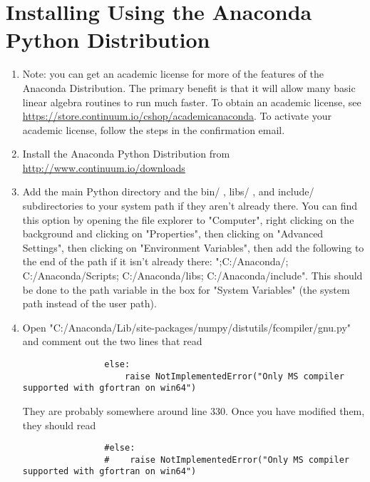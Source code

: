 \section*{Installing Using the Anaconda Python Distribution}
\begin{enumerate}
\item Note: you can get an academic license for more of the features of the Anaconda Distribution.
The primary benefit is that it will allow many basic linear algebra routines to run much faster.
To obtain an academic license, see \url{https://store.continuum.io/cshop/academicanaconda}.
To activate your academic license, follow the steps in the confirmation email.

\item Install the Anaconda Python Distribution from \url{http://www.continuum.io/downloads}

\item Add the main Python directory and the bin/ , libs/ , and include/ subdirectories to your system path if they aren't already there.
You can find this option by opening the file explorer to "Computer", right clicking on the background and clicking on "Properties", then clicking on "Advanced Settings", then clicking on "Environment Variables", then add the following to the end of the path if it isn't already there: ";C:/Anaconda/; C:/Anaconda/Scripts; C:/Anaconda/libs; C:/Anaconda/include". This should be done to the path variable in the box for "System Variables" (the system path instead of the user path).

\item Open "C:/Anaconda/Lib/site-packages/numpy/distutils/fcompiler/gnu.py" and comment out the two lines that read 
\begin{lstlisting}
                else:
                    raise NotImplementedError("Only MS compiler supported with gfortran on win64")
\end{lstlisting}
They are probably somewhere around line $330$.
Once you have modified them, they should read
\begin{lstlisting}
                #else:
                #    raise NotImplementedError("Only MS compiler supported with gfortran on win64")
\end{lstlisting}


\end{enumerate}
